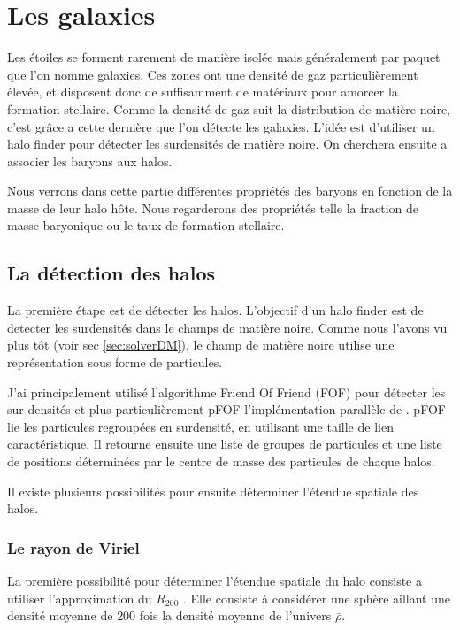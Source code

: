 \chapter{Les galaxies}

Les étoiles se forment rarement de manière isolée mais généralement par paquet que l'on nomme galaxies.
Ces zones ont une densité de gaz particulièrement élevée, et disposent donc de suffisamment de matériaux pour amorcer la formation stellaire.
Comme la densité de gaz suit la distribution de matière noire, c'est grâce a cette dernière que l'on détecte les galaxies.
L'idée est d'utiliser un halo finder pour détecter les surdensités de matière noire.
On cherchera ensuite a associer les baryons aux halos.

Nous verrons dans cette partie différentes propriétés des baryons en fonction de la masse de leur halo hôte.
Nous regarderons des propriétés telle la fraction de masse baryonique ou le taux de formation stellaire.


\section{La détection des halos}
La première étape est de détecter les halos.
L'objectif d'un halo finder est de detecter les surdensités dans le champs de matière noire.
Comme nous l'avons vu plus tôt (voir sec \ref{sec:solverDM}), le champ de matière noire utilise une représentation sous forme de particules.

J'ai principalement utilisé l’algorithme Friend Of Friend (FOF) pour détecter les sur-densités et plus particulièrement pFOF l'implémentation parallèle de \cite{2014A&A...564A..13R}.
pFOF lie les particules regroupées en surdensité, en utilisant une taille de lien caractéristique.
Il retourne ensuite une liste de groupes de particules et une liste de positions déterminées par le centre de masse des particules de chaque halos.

Il existe plusieurs possibilités pour ensuite déterminer l'étendue spatiale des halos.

\subsection{Le rayon de Viriel}
La première possibilité pour déterminer l'étendue spatiale du halo consiste a utiliser l'approximation du $R_{200}$ \citep{1997ApJ...490..493N}.
Elle consiste à considérer une sphère aillant une densité moyenne de $200$ fois la densité moyenne de l'univers $\bar{\rho}$.

